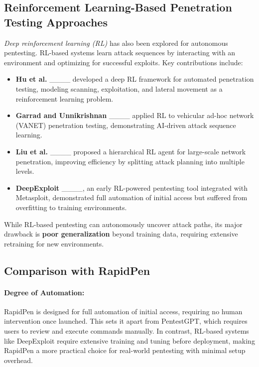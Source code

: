 \subsection{Reinforcement Learning-Based Penetration Testing Approaches}

\textit{Deep reinforcement learning (RL)} has also been explored for autonomous pentesting. RL-based systems learn attack sequences by interacting with an environment and optimizing for successful exploits. Key contributions include:
\begin{itemize}
    \item \textbf{Hu et al.} ____ developed a deep RL framework for automated penetration testing, modeling scanning, exploitation, and lateral movement as a reinforcement learning problem.
    \item \textbf{Garrad and Unnikrishnan} ____ applied RL to vehicular ad-hoc network (VANET) penetration testing, demonstrating AI-driven attack sequence learning.
    \item \textbf{Liu et al.} ____ proposed a hierarchical RL agent for large-scale network penetration, improving efficiency by splitting attack planning into multiple levels.
    \item \textbf{DeepExploit} ____, an early RL-powered pentesting tool integrated with Metasploit, demonstrated full automation of initial access but suffered from overfitting to training environments.
\end{itemize}
While RL-based pentesting can autonomously uncover attack paths, its major drawback is \textbf{poor generalization} beyond training data, requiring extensive retraining for new environments.

\subsection{Comparison with RapidPen}

\paragraph{Degree of Automation:} RapidPen is designed for full automation of initial access, requiring no human intervention once launched. This sets it apart from PentestGPT, which requires users to review and execute commands manually. In contrast, RL-based systems like DeepExploit require extensive training and tuning before deployment, making RapidPen a more practical choice for real-world pentesting with minimal setup overhead.

